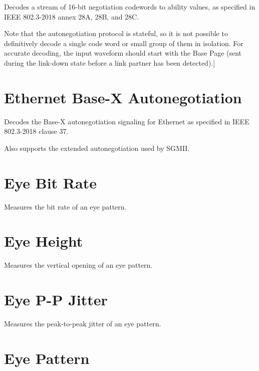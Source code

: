 Decodes a stream of 16-bit negotiation codewords to ability values, as specified in IEEE 802.3-2018 annex 28A, 28B, and
28C.

Note that the autonegotiation protocol is stateful, so it is not possible to definitively decode a single code word or
small group of them in isolation. For accurate decoding, the input waveform should start with the Base Page (sent
during the link-down state before a link partner has been detected).]

\pagebreak
\section{Ethernet Base-X Autonegotiation}

Decodes the Base-X autonegotiation signaling for Ethernet as specified in IEEE 802.3-2018 clause 37.

Also supports the extended autonegotiation used by SGMII.

\pagebreak
\section{Eye Bit Rate}

Measures the bit rate of an eye pattern.

\pagebreak
\section{Eye Height}

Measures the vertical opening of an eye pattern.

\pagebreak
\section{Eye P-P Jitter}

Measures the peak-to-peak jitter of an eye pattern.

\pagebreak
\section{Eye Pattern}

